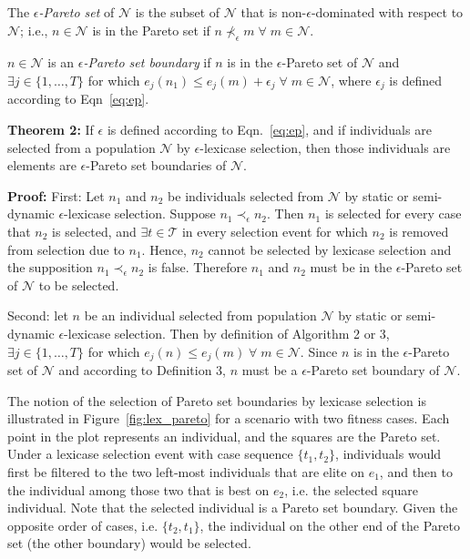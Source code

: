 \documentclass[preprint]{article}
\begin{document}
 The {\it $\epsilon$-Pareto set} of $\mathcal{N}$ is the subset of $\mathcal{N}$ that is non-$\epsilon$-dominated with respect to $\mathcal{N}$; i.e., $n \in \mathcal{N}$ is in the Pareto set if $n \nprec_{\epsilon} m \; \forall \; m \in \mathcal{N}$. 
\bigskip

\medskip
{} $n \in \mathcal{N}$ is an {\it $\epsilon$-Pareto set boundary} if $n$ is in the $\epsilon$-Pareto set of $\mathcal{N}$ and $\exists j \in \{1,\dots,T\}$ for which $e_j(n_1) \leq e_j(m)+ \epsilon_j \; \forall \; m \in \mathcal{N}$, where $\epsilon_j$ is defined according to Eqn~\ref{eq:ep}. \bigskip


\medskip
\noindent \textbf{Theorem 2:} If $\epsilon$ is defined according to Eqn.~\ref{eq:ep}, and if individuals are selected from a population $\mathcal{N}$ by $\epsilon$-lexicase selection, then those individuals are elements are $\epsilon$-Pareto set boundaries of $\mathcal{N}$.  
\medskip


\noindent \textbf{Proof:} First: Let $n_1$ and $n_2$ be individuals selected from $\mathcal{N}$ by static or semi-dynamic $\epsilon$-lexicase selection. Suppose $n_1 \prec_{\epsilon} n_2$. Then $n_1$ is selected for every case that $n_2$ is selected, and $\exists t \in \mathcal{T}$ in every selection event for which $n_2$ is removed from selection due to $n_1$. Hence, $n_2$ cannot be selected by lexicase selection and the supposition $n_1 \prec_{\epsilon} n_2$ is false.  Therefore $n_1$ and $n_2$ must be in the $\epsilon$-Pareto set of $\mathcal{N}$ to be selected. 

Second: let $n$ be an individual selected from population $\mathcal{N}$ by static or semi-dynamic $\epsilon$-lexicase selection. Then by definition of Algorithm 2 or 3, $\exists j \in \{1,\dots,T\}$ for which $e_j(n) \leq e_j(m) \; \forall \; m \in \mathcal{N}$. Since $n$ is in the $\epsilon$-Pareto set of $\mathcal{N}$ and according to Definition 3, $n$ must be a $\epsilon$-Pareto set boundary of $\mathcal{N}$.  
\bigskip

The notion of the selection of Pareto set boundaries by lexicase selection is illustrated in Figure~\ref{fig:lex_pareto} for a scenario with two fitness cases. Each point in the plot represents an individual, and the squares are the Pareto set. Under a lexicase selection event with case sequence $\{t_1, t_2\}$, individuals would first be filtered to the two left-most individuals that are elite on $e_1$, and then to the individual among those two that is best on $e_2$, i.e. the selected square individual. Note that the selected individual is a Pareto set boundary. Given the opposite order of cases, i.e. $\{t_2, t_1\}$, the individual on the other end of the Pareto set (the other boundary) would be selected.   
\end{document}
